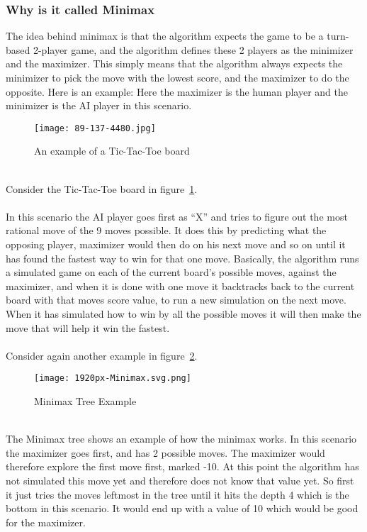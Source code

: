 \subsubsection{Why is it called Minimax}
The idea behind minimax is that the algorithm expects the game to be a turn-based 2-player game, and the algorithm defines these 2 players as the minimizer and the maximizer. 
This simply means that the algorithm always expects the minimizer to pick the move with the lowest score, and the maximizer to do the opposite. 
Here is an example: Here the maximizer is the human player and the minimizer is the AI player in this scenario.\\
\begin{figure}
    \caption{An example of a Tic-Tac-Toe board}
    \texttt{[image: 89-137-4480.jpg]}
    \label{fig:Board Example}
\end{figure}\\
Consider the Tic-Tac-Toe board in figure~\ref{fig:Board Example}.\\\\
In this scenario the AI player goes first as “X” and tries to figure out the most rational move of the 9 moves possible. 
It does this by predicting what the opposing player, maximizer would then do on his next move and so on until it has found the fastest way to win for that one move. 
Basically, the algorithm runs a simulated game on each of the current board’s possible moves, against the maximizer, 
and when it is done with one move it backtracks back to the current board with that moves score value, to run a new simulation on the next move. 
When it has simulated how to win by all the possible moves it will then make the move that will help it win the fastest.\\\\
Consider again another example in figure~\ref{fig:Tree Example}.\\
\begin{figure}
    \caption{Minimax Tree Example}
    \texttt{[image: 1920px-Minimax.svg.png]}
    \label{fig:Tree Example}
\end{figure}\\
The Minimax tree shows an example of how the minimax works. In this scenario the maximizer goes first, and has 2 possible moves. 
The maximizer would therefore explore the first move first, marked -10. At this point the algorithm has not simulated this move yet and therefore does not know that value yet. 
So first it just tries the moves leftmost in the tree until it hits the depth 4 which is the bottom in this scenario. It would end up with a value of 10 which would be good for the maximizer. 
